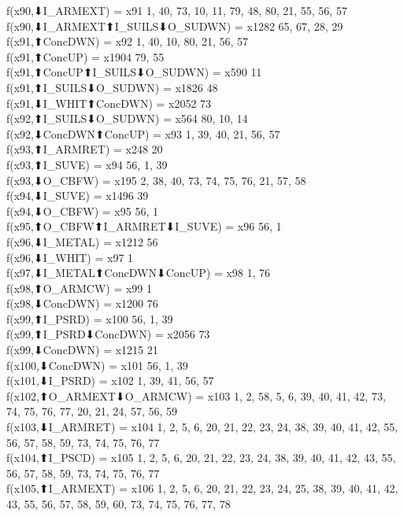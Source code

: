 f(x90,⬇I_ARMEXT) = x91 {1, 40, 73, 10, 11, 79, 48, 80, 21, 55, 56, 57} \\
f(x90,⬇I_ARMEXT⬆I_SUILS⬇O_SUDWN) = x1282 {65, 67, 28, 29} \\
f(x91,⬆ConcDWN) = x92 {1, 40, 10, 80, 21, 56, 57} \\
f(x91,⬆ConcUP) = x1904 {79, 55} \\
f(x91,⬆ConcUP⬆I_SUILS⬇O_SUDWN) = x590 {11} \\
f(x91,⬆I_SUILS⬇O_SUDWN) = x1826 {48} \\
f(x91,⬇I_WHIT⬆ConcDWN) = x2052 {73} \\
f(x92,⬆I_SUILS⬇O_SUDWN) = x564 {80, 10, 14} \\
f(x92,⬇ConcDWN⬆ConcUP) = x93 {1, 39, 40, 21, 56, 57} \\
f(x93,⬆I_ARMRET) = x248 {20} \\
f(x93,⬆I_SUVE) = x94 {56, 1, 39} \\
f(x93,⬇O_CBFW) = x195 {2, 38, 40, 73, 74, 75, 76, 21, 57, 58} \\
f(x94,⬇I_SUVE) = x1496 {39} \\
f(x94,⬇O_CBFW) = x95 {56, 1} \\
f(x95,⬆O_CBFW⬆I_ARMRET⬇I_SUVE) = x96 {56, 1} \\
f(x96,⬇I_METAL) = x1212 {56} \\
f(x96,⬇I_WHIT) = x97 {1} \\
f(x97,⬇I_METAL⬆ConcDWN⬇ConcUP) = x98 {1, 76} \\
f(x98,⬆O_ARMCW) = x99 {1} \\
f(x98,⬇ConcDWN) = x1200 {76} \\
f(x99,⬆I_PSRD) = x100 {56, 1, 39} \\
f(x99,⬆I_PSRD⬇ConcDWN) = x2056 {73} \\
f(x99,⬇ConcDWN) = x1215 {21} \\
f(x100,⬇ConcDWN) = x101 {56, 1, 39} \\
f(x101,⬇I_PSRD) = x102 {1, 39, 41, 56, 57} \\
f(x102,⬆O_ARMEXT⬇O_ARMCW) = x103 {1, 2, 58, 5, 6, 39, 40, 41, 42, 73, 74, 75, 76, 77, 20, 21, 24, 57, 56, 59} \\
f(x103,⬇I_ARMRET) = x104 {1, 2, 5, 6, 20, 21, 22, 23, 24, 38, 39, 40, 41, 42, 55, 56, 57, 58, 59, 73, 74, 75, 76, 77} \\
f(x104,⬆I_PSCD) = x105 {1, 2, 5, 6, 20, 21, 22, 23, 24, 38, 39, 40, 41, 42, 43, 55, 56, 57, 58, 59, 73, 74, 75, 76, 77} \\
f(x105,⬆I_ARMEXT) = x106 {1, 2, 5, 6, 20, 21, 22, 23, 24, 25, 38, 39, 40, 41, 42, 43, 55, 56, 57, 58, 59, 60, 73, 74, 75, 76, 77, 78} \\
